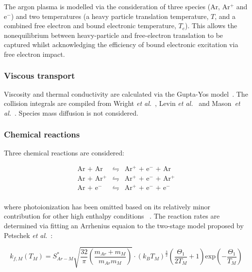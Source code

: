The argon plasma is modelled via the consideration of three species (Ar, Ar$^+$ and e$^-$) and two temperatures (a heavy particle translation temperature, $T$, and a combined free electron and bound electronic temperature, $T_e$).
This allows the nonequilibrium between heavy-particle and free-electron translation to be captured whilst acknowledging the efficiency of bound electronic excitation via free electron impact.

\subsubsection{Viscous transport}

Viscosity and thermal conductivity are calculated via the Gupta-Yos model~\cite{GYT+90}.
The collision integrals are compiled from  Wright \textit{et al.}~\cite{WBP+2005}, Levin \textit{et al.}~\cite{LW2005} and Mason~\textit{et al.}~\cite{Mas67}.
Species mass diffusion is not considered.

\subsubsection{Chemical reactions}

Three chemical reactions are considered:

\begin{eqnarray}
 \text{Ar + Ar} &\leftrightharpoons& \text{Ar$^+$ + e$^-$ + Ar} \label{eq:HPII} \\
 \text{Ar + Ar$^+$} &\leftrightharpoons& \text{Ar$^+$ + e$^-$ + Ar$^+$} \label{eq:HPII+} \\
 \text{Ar + e$^-$} &\leftrightharpoons& \text{Ar$^+$ + e$^-$ + e$^-$}  \label{eq:EII} \\
 \end{eqnarray}
 
 \noindent where photoionization has been omitted based on its relatively minor contribution for other high enthalpy conditions~\cite{Cam91} .
 The reaction rates are determined via fitting an Arrhenius equaion to the two-stage model proposed by Petschek \textit{et al.}~\cite{PB57}:
 
 \begin{equation}
 k_{f,M}(T_M) = S_{Ar-M}^* \sqrt{ \frac{32}{\pi} \left ( \frac{m_{Ar} + m_M}{m_{Ar} m_M} \right ) } \cdot \left ( k_B T_M \right )^\frac{3}{2} \left ( \frac{\Theta_{1}}{2T_M} + 1 \right ) \text{exp} \left ( - \frac{\Theta_{1}}{T_M} \right )
\end{equation}

